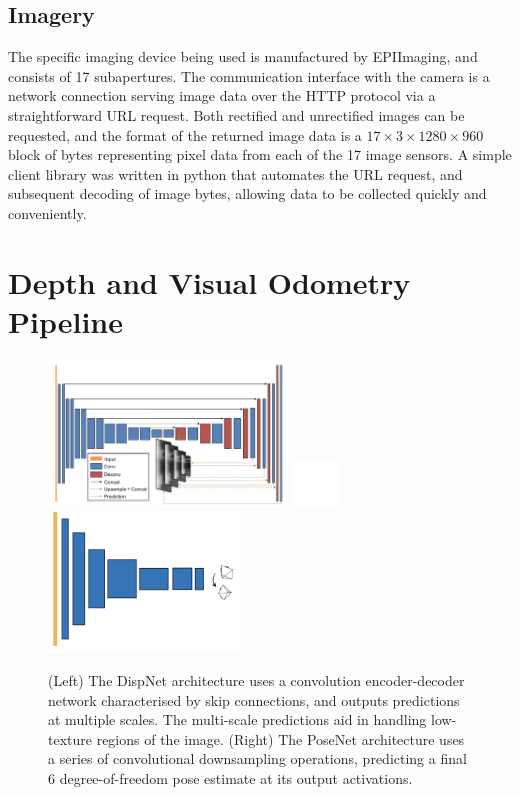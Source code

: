 \documentclass[openany]{book}
\begin{document}
\subsection{Imagery}

The specific imaging device being used is manufactured by EPIImaging, and consists of 17 subapertures. The communication interface with the camera is a network connection serving image data over the HTTP protocol via a straightforward URL request. Both rectified and unrectified images can be requested, and the format of the returned image data is a $17\times 3 \times 1280 \times 960$ block of bytes representing pixel data from each of the 17 image sensors. A simple client library was written in python that automates the URL request, and subsequent decoding of image bytes, allowing data to be collected quickly and conveniently.


\section{Depth and Visual Odometry Pipeline}

\begin{figure}[htbp]
    \centering 
    \includegraphics[width=2.5in]{images/dispnet.png}
    \includegraphics[width=0.5in]{images/blank.png}
    \includegraphics[width=2in]{images/posenet.png}
    \caption{(Left) The DispNet architecture uses a convolution encoder-decoder network characterised by skip connections, and outputs predictions at multiple scales. The multi-scale predictions aid in handling low-texture regions of the image. (Right) The PoseNet architecture uses a series of convolutional downsampling operations, predicting a final 6 degree-of-freedom pose estimate at its output activations.}
 \end{figure}
\end{document}
